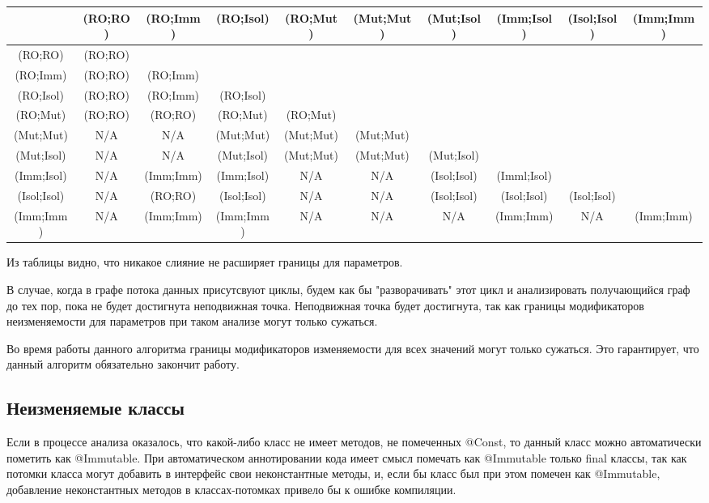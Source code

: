 {\tiny

	\begin{tabular}{| c | c | c | c | c | c | c | c | c | c |}
	\hline  &(RO;RO)&(RO;Imm)&(RO;Isol)&(RO;Mut)&(Mut;Mut)&(Mut;Isol)&(Imm;Isol)&(Isol;Isol)&(Imm;Imm)\\
	\hline(RO;RO)&(RO;RO)& & & & & & & & \\
	\hline(RO;Imm)&(RO;RO)&(RO;Imm) & & & & & & & \\
	\hline(RO;Isol)&(RO;RO)&(RO;Imm)&(RO;Isol)& & & & & & \\
	\hline(RO;Mut)&(RO;RO)&(RO;RO)&(RO;Mut)&(RO;Mut) & & & & & \\
	\hline(Mut;Mut)&N/A&N/A&(Mut;Mut)&(Mut;Mut)&(Mut;Mut) & & & & \\
	\hline(Mut;Isol)&N/A&N/A&(Mut;Isol)&(Mut;Mut)&(Mut;Mut)&(Mut;Isol)& & & \\
	\hline(Imm;Isol)&N/A&(Imm;Imm)&(Imm;Isol)&N/A&N/A&(Isol;Isol)&(Imml;Isol)& & \\
	\hline(Isol;Isol)&N/A&(RO;RO)&(Isol;Isol)&N/A&N/A&(Isol;Isol)&(Isol;Isol)&(Isol;Isol)&\\
	\hline(Imm;Imm)&N/A&(Imm;Imm)&(Imm;Imm)&N/A&N/A&N/A&(Imm;Imm)&N/A&(Imm;Imm)\\    
	\hline
    \end{tabular}

}
Из таблицы видно, что никакое слияние не расширяет границы для параметров.

В случае, когда в графе потока данных присутсвуют циклы, будем как бы "разворачивать" этот цикл и анализировать получающийся граф до тех пор, пока не будет достигнута неподвижная точка. Неподвижная точка будет достигнута, так как границы модификаторов неизменяемости для параметров при таком анализе могут только сужаться.

Во время работы данного алгоритма границы модификаторов изменяемости для всех значений могут только сужаться. Это гарантирует, что данный алгоритм обязательно закончит работу.

\subsection{Неизменяемые классы}

Если в процессе анализа оказалось, что какой-либо класс не имеет методов, не помеченных @Const, то данный класс можно автоматически пометить как @Immutable. При автоматическом аннотировании кода имеет смысл помечать как @Immutable только final классы, так как потомки класса могут добавить в интерфейс свои неконстантные методы, и, если бы класс был при этом помечен как @Immutable, добавление неконстантных методов в классах-потомках привело бы к ошибке компиляции.


